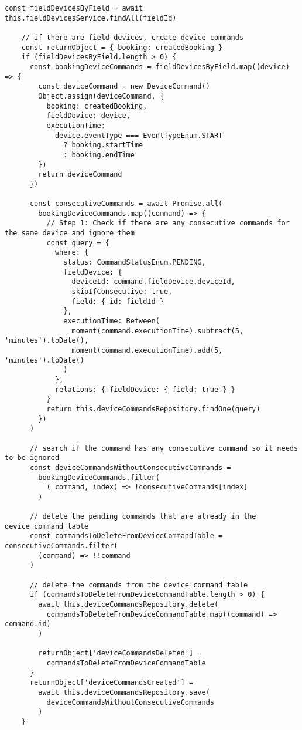 \begin{lstlisting}[caption={\textit{Service} para a rota de criação de \textit{booking} (agendamento).},label={cod:create-booking-service}]
    const fieldDevicesByField = await this.fieldDevicesService.findAll(fieldId)

    // if there are field devices, create device commands
    const returnObject = { booking: createdBooking }
    if (fieldDevicesByField.length > 0) {
      const bookingDeviceCommands = fieldDevicesByField.map((device) => {
        const deviceCommand = new DeviceCommand()
        Object.assign(deviceCommand, {
          booking: createdBooking,
          fieldDevice: device,
          executionTime:
            device.eventType === EventTypeEnum.START
              ? booking.startTime
              : booking.endTime
        })
        return deviceCommand
      })

      const consecutiveCommands = await Promise.all(
        bookingDeviceCommands.map((command) => {
          // Step 1: Check if there are any consecutive commands for the same device and ignore them
          const query = {
            where: {
              status: CommandStatusEnum.PENDING,
              fieldDevice: {
                deviceId: command.fieldDevice.deviceId,
                skipIfConsecutive: true,
                field: { id: fieldId }
              },
              executionTime: Between(
                moment(command.executionTime).subtract(5, 'minutes').toDate(),
                moment(command.executionTime).add(5, 'minutes').toDate()
              )
            },
            relations: { fieldDevice: { field: true } }
          }
          return this.deviceCommandsRepository.findOne(query)
        })
      )

      // search if the command has any consecutive command so it needs to be ignored
      const deviceCommandsWithoutConsecutiveCommands =
        bookingDeviceCommands.filter(
          (_command, index) => !consecutiveCommands[index]
        )

      // delete the pending commands that are already in the device_command table
      const commandsToDeleteFromDeviceCommandTable = consecutiveCommands.filter(
        (command) => !!command
      )

      // delete the commands from the device_command table
      if (commandsToDeleteFromDeviceCommandTable.length > 0) {
        await this.deviceCommandsRepository.delete(
          commandsToDeleteFromDeviceCommandTable.map((command) => command.id)
        )

        returnObject['deviceCommandsDeleted'] =
          commandsToDeleteFromDeviceCommandTable
      }
      returnObject['deviceCommandsCreated'] =
        await this.deviceCommandsRepository.save(
          deviceCommandsWithoutConsecutiveCommands
        )
    }


\end{lstlisting}
